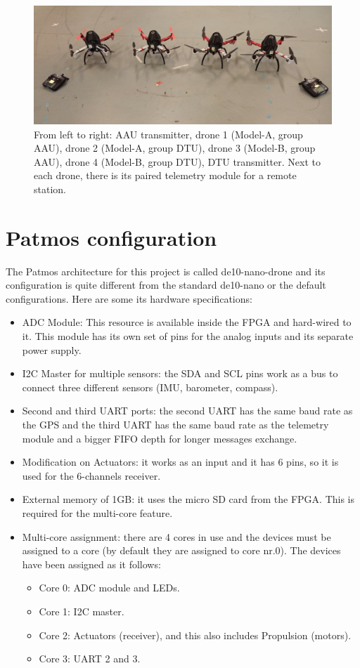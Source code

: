 \begin{figure} [H]
    \centering
    \includegraphics[width=\textwidth]{Figures/implementation/four_drones_tel.jpg}
    \caption{From left to right: AAU transmitter, drone 1 (Model-A, group AAU), drone 2 (Model-A, group DTU), drone 3 (Model-B, group AAU), drone 4 (Model-B, group DTU), DTU transmitter. Next to each drone, there is its paired telemetry module for a remote station.}
    \label{fig:imp_4drones}
\end{figure}


\section{Patmos configuration}

The Patmos architecture for this project is called de10-nano-drone and its configuration is quite different from the standard de10-nano or the default configurations. Here are some its hardware specifications:

\begin{itemize}
    \item ADC Module: This resource is available inside the FPGA and hard-wired to it. This module has its own set of pins for the analog inputs and its separate power supply.
    \item I2C Master for multiple sensors: the SDA and SCL pins work as a bus to connect three different sensors (IMU, barometer, compass).
    \item Second and third UART ports: the second UART has the same baud rate as the GPS and the third UART has the same baud rate as the telemetry module and a bigger FIFO depth for longer messages exchange.
    \item Modification on Actuators: it works as an input and it has 6 pins, so it is used for the 6-channels receiver.
    \item External memory of 1GB: it uses the micro SD card from the FPGA. This is required for the multi-core feature.
    \item Multi-core assignment: there are 4 cores in use and the devices must be assigned to a core (by default they are assigned to core nr.0). The devices have been assigned as it follows:
    \begin{itemize}
        \item Core 0: ADC module and LEDs.
        \item Core 1: I2C master.
        \item Core 2: Actuators (receiver), and this also includes Propulsion (motors).
        \item Core 3: UART 2 and 3.
    \end{itemize}
\end{itemize}


